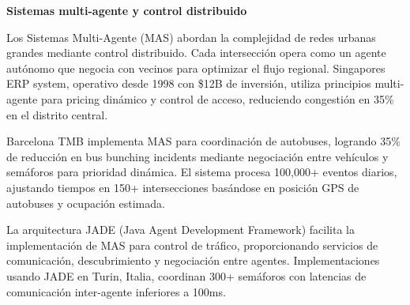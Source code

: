 \documentclass[12pt,a4paper,oneside]{report}
\begin{document}
\textbf{Sistemas multi-agente y control distribuido}

Los Sistemas Multi-Agente (MAS) abordan la complejidad de redes urbanas grandes mediante control distribuido. Cada intersección opera como un agente autónomo que negocia con vecinos para optimizar el flujo regional. Singapore\textquotesingle s ERP system, operativo desde 1998 con \$12B de inversión, utiliza principios multi-agente para pricing dinámico y control de acceso, reduciendo congestión en 35\% en el distrito central.

Barcelona TMB implementa MAS para coordinación de autobuses, logrando 35\% de reducción en bus bunching incidents mediante negociación entre vehículos y semáforos para prioridad dinámica. El sistema procesa 100,000+ eventos diarios, ajustando tiempos en 150+ intersecciones basándose en posición GPS de autobuses y ocupación estimada.

La arquitectura JADE (Java Agent Development Framework) facilita la implementación de MAS para control de tráfico, proporcionando servicios de comunicación, descubrimiento y negociación entre agentes. Implementaciones usando JADE en Turin, Italia, coordinan 300+ semáforos con latencias de comunicación inter-agente inferiores a 100ms.

\label{tbl:2.5}
\end{document}
